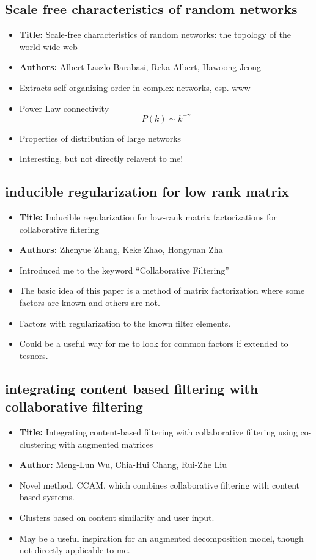 \documentclass{article}
\begin{document}
\subsection{Scale free characteristics of random networks}
\begin{itemize}
  \item {\bf Title:} Scale-free characteristics of random networks:
the topology of the world-wide web
  \item {\bf Authors: } Albert-Laszlo Barabasi, Reka Albert, Hawoong Jeong
  \item Extracts self-organizing order in complex networks, esp. www
  \item Power Law connectivity
  \[
  P(k)\sim k^{-\gamma}
  \]
  \item Properties of distribution of large networks
  \item Interesting, but not directly relavent to me!
\end{itemize}


\subsection{inducible regularization for low rank matrix}
\begin{itemize}
  \item {\bf Title: } Inducible regularization for low-rank matrix factorizations for collaborative filtering
  \item {\bf Authors: } Zhenyue Zhang, Keke Zhao, Hongyuan Zha
  \item Introduced me to the keyword ``Collaborative Filtering''
  \item The basic idea of this paper is a method of matrix factorization where some factors are known and others are not.
  \item Factors with regularization to the known filter elements.
  \item Could be a useful way for me to look for common factors if extended to tesnors.
\end{itemize}

\subsection{integrating content based filtering with collaborative filtering}
\begin{itemize}
  \item {\bf Title:} Integrating content-based filtering with collaborative filtering using co-clustering with augmented matrices
  \item {\bf Author:} Meng-Lun Wu, Chia-Hui Chang, Rui-Zhe Liu
  \item Novel method, CCAM, which combines collaborative filtering with content based systems.
  \item Clusters based on content similarity and user input.
  \item May be a useful inspiration for an augmented decomposition model, though not directly applicable to me.
\end{itemize}
\end{document}
